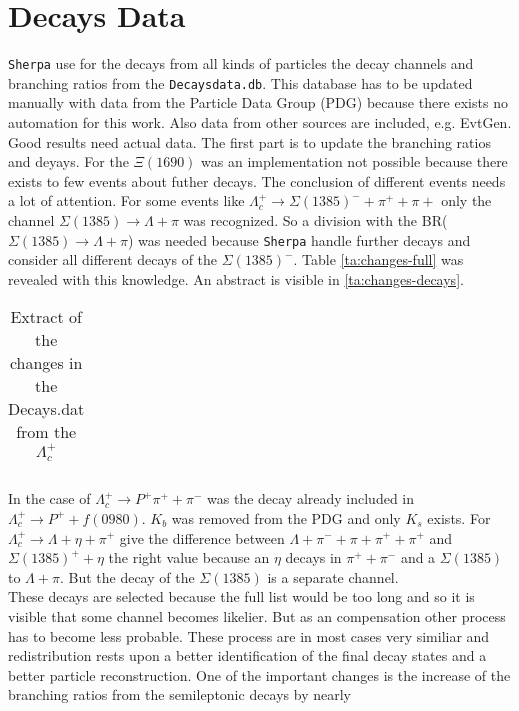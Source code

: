\section{Decays Data}
\texttt{Sherpa} use for the decays from all kinds of particles the decay channels 
and branching ratios from the \texttt{Decaysdata.db}. This database has to be 
updated manually with data from the Particle Data Group (PDG) because there 
exists no automation for this work. Also data from other sources are included, 
e.g. EvtGen.\\
Good results need actual data. The first part is to update the branching ratios 
and deyays. For the \(\Xi(1690)\) was an implementation not possible because 
there exists to few events about futher decays. The conclusion of different events 
needs a lot of attention. For some events like \(\Lambda_c^+ \rightarrow  
\Sigma(1385)^- + \pi^+ + \pi+\) only the channel \(\Sigma(1385) \rightarrow 
\Lambda + \pi\) was recognized. So a division with the BR(\(\Sigma(1385) 
\rightarrow \Lambda + \pi\)) was needed because \texttt{Sherpa} handle further 
decays and consider all different decays of the \(\Sigma(1385)^-\). Table 
{\eqref{ta:changes-full}} was revealed with this knowledge. An abstract is 
visible in {\eqref{ta:changes-decays}}.
\begin{longtable}{| c | c | c | c |}
  \caption{Extract of the changes in the Decays.dat from the \(\Lambda_c^+\)}\label{ta:changes-decays}\\ 
  \hline
  
\end{longtable}
In the case of \(\Lambda_c^+ \rightarrow P^+ \pi^+ + \pi^-\) was the decay 
already included in \(\Lambda_c^+ \rightarrow P^+ + f(0980)\). \(K_b\) was 
removed from the PDG and only \(K_s\) exists. For \(\Lambda_c^+ \rightarrow 
\Lambda + \eta + \pi^+\) give the difference between \(\Lambda + \pi^- + 
\pi + \pi^+ + \pi^+\) and  \(\Sigma(1385)^+ + \eta\) the right value because 
an \(\eta\) decays in \(\pi^+ + \pi^-\) and a \(\Sigma(1385)\) to 
\(\Lambda + \pi\). But the decay of the \(\Sigma(1385)\) is a separate channel.\\
These decays are selected because the full list would be too long and so 
it is visible that some channel becomes likelier. But as an compensation other 
process has to become less probable. These process are in most cases very 
similiar and redistribution rests upon a better identification of the final 
decay states and a better particle reconstruction. One of the important changes 
is the increase of the branching ratios from the semileptonic decays by nearly 
